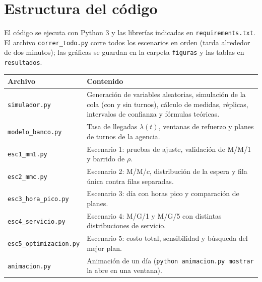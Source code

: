 \documentclass[11pt,letterpaper]{article}
\begin{document}
\appendix
\section{Estructura del código}
El código se ejecuta con Python 3 y las librerías indicadas en \texttt{requirements.txt}.
El archivo \texttt{correr\_todo.py} corre todos los escenarios en orden (tarda alrededor de
dos minutos); las gráficas se guardan en la carpeta \texttt{figuras} y las tablas en
\texttt{resultados}.

\begin{table}[H]
\centering
\small
\begin{tabular}{@{}lp{10cm}@{}}
\toprule
Archivo & Contenido \\
\midrule
\texttt{simulador.py} & Generación de variables aleatorias, simulación de la cola (con y sin turnos), cálculo de medidas, réplicas, intervalos de confianza y fórmulas teóricas. \\
\texttt{modelo\_banco.py} & Tasa de llegadas $\lambda(t)$, ventanas de refuerzo y planes de turnos de la agencia. \\
\texttt{esc1\_mm1.py} & Escenario 1: pruebas de ajuste, validación de M/M/1 y barrido de $\rho$. \\
\texttt{esc2\_mmc.py} & Escenario 2: M/M/$c$, distribución de la espera y fila única contra filas separadas. \\
\texttt{esc3\_hora\_pico.py} & Escenario 3: día con horas pico y comparación de planes. \\
\texttt{esc4\_servicio.py} & Escenario 4: M/G/1 y M/G/5 con distintas distribuciones de servicio. \\
\texttt{esc5\_optimizacion.py} & Escenario 5: costo total, sensibilidad y búsqueda del mejor plan. \\
\texttt{animacion.py} & Animación de un día (\texttt{python animacion.py mostrar} la abre en una ventana). \\
\bottomrule
\end{tabular}
\end{table}
\end{document}
